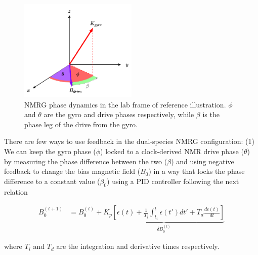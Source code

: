 \documentclass{article}
\begin{document}
\begin{figure}[h]
\centering
\includegraphics[width=0.5\textwidth]{Theory/Figures/NMRG_phase_dynamics.png}
\caption{NMRG phase dynamics in the lab frame of reference illustration. $\phi$ and $\theta$ are the gyro and drive phases respectively, while $\beta$ is the phase leg of the drive from the gyro.}
\label{fig:nmrg_phase_dynamics}
\end{figure}

There are few ways to use feedback in the dual-species NMRG configuration: (1) We can keep the gyro phase ($\phi$) locked to a clock-derived NMR drive phase ($\theta$) by measuring the phase difference between the two ($\beta$) and using negative feedback to change the bias magnetic field ($B_0$) in a way that locks the phase difference to a constant value ($\beta_0$) using a PID controller following the next relation

\begin{align}
     B_{0}^{\left(t+1\right)} &= B_{0}^{\left(t\right)} + \underset{\delta B_{0}^{\left(t\right)}}{\underbrace{K_p \left[ \epsilon\left(t\right) + \frac{1}{T_i} \int_{t_i}^{t} \epsilon\left(t'\right)dt' + T_{d} \frac{d \epsilon\left(t\right)}{dt} \right]}}
\end{align}

where $T_i$ and $T_d$ are the integration and derivative times respectively.



\end{document}
